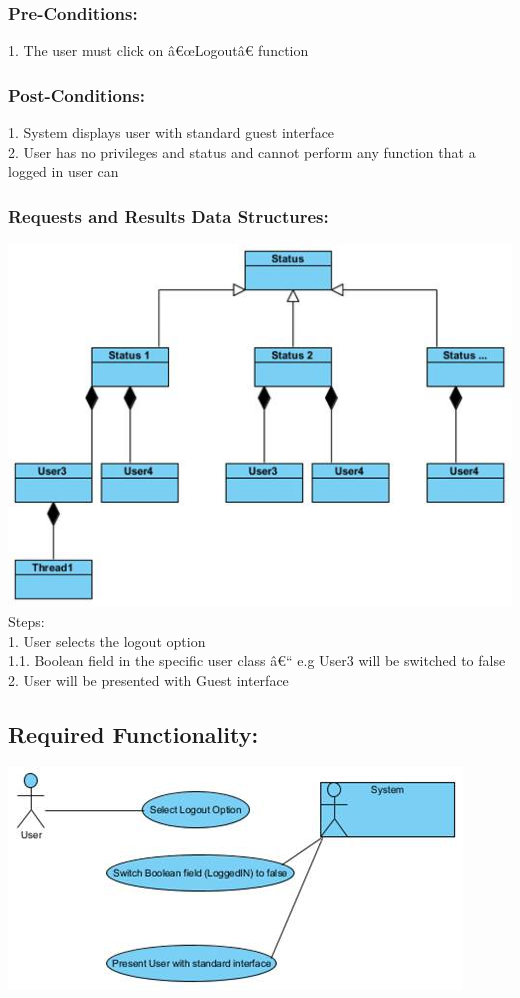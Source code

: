 \documentclass[a4paper,11pt]{article}
\begin{document}
\subsubsection*{Pre-Conditions:}
1.	The user must click on â€œLogoutâ€ function\\
\subsubsection*{Post-Conditions:}
1.	System displays user with standard guest interface\\
2.	User has no privileges and status and cannot perform any function that a logged in user can\\
\subsubsection*{Requests and Results Data Structures:}
\includegraphics[width=1\linewidth]{./Images/CRUDThread/Diagrams/17.jpg}\\
Steps:\\
1.	User selects the logout option\\
1.1.	Boolean field in the specific user class â€“ e.g User3 will be switched to false\\
2.	User will be presented with Guest interface\\
\subsection{Required Functionality:} 
\includegraphics[width=1\linewidth]{./Images/CRUDThread/Diagrams/18.jpg}\\
\end{document}
